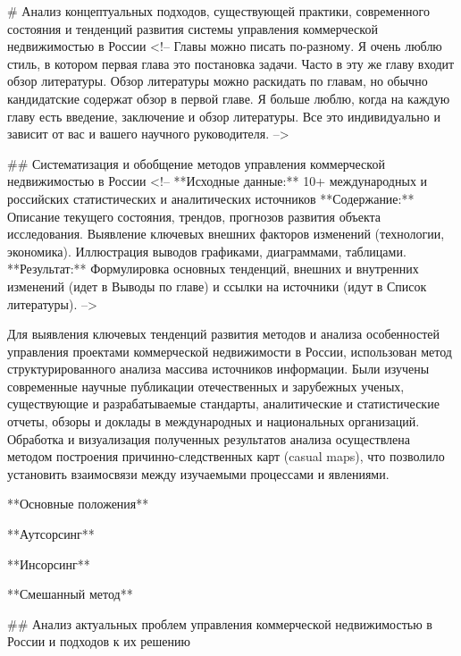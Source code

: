 # Анализ концептуальных подходов, существующей практики, современного состояния и тенденций развития системы управления коммерческой недвижимостью в России\label{ch:ch1}
<!-- Главы можно писать по-разному. Я очень люблю стиль, в котором первая глава это постановка задачи. Часто в эту же главу входит обзор литературы. Обзор литературы можно раскидать по главам, но обычно кандидатские содержат обзор в первой главе. Я больше люблю, когда на каждую главу есть введение, заключение и обзор литературы. Все это индивидуально и зависит от вас и вашего научного руководителя. -->

## Систематизация и обобщение методов управления коммерческой недвижимостью в России\label{sec:ch1/sect1}
<!--
**Исходные данные:**
10+ международных и российских статистических и аналитических источников
**Содержание:**
Описание текущего состояния, трендов, прогнозов развития объекта исследования. Выявление ключевых внешних факторов изменений (технологии, экономика). Иллюстрация выводов графиками, диаграммами, таблицами.
**Результат:**
Формулировка основных тенденций, внешних и внутренних изменений (идет в Выводы по главе) и ссылки на источники (идут в Список литературы). -->

Для выявления ключевых тенденций развития методов и анализа особенностей  управления проектами коммерческой недвижимости в России, использован метод структурированного анализа массива источников информации. Были изучены современные научные публикации отечественных и зарубежных ученых, существующие и разрабатываемые стандарты, аналитические и статистические отчеты, обзоры и доклады в международных и национальных организаций. Обработка и визуализация полученных результатов анализа осуществлена методом построения причинно-следственных карт (casual maps), что позволило установить взаимосвязи между изучаемыми процессами и явлениями.

**Основные положения**

**Аутсорсинг**

**Инсорсинг**

**Смешанный метод**

## Анализ актуальных проблем управления коммерческой недвижимостью в России и подходов к их решению\label{sec:ch1/sect2}

